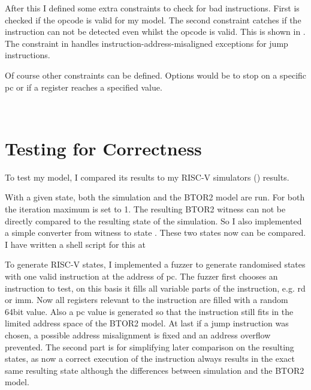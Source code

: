 After this I defined some extra constraints to check for bad instructions.
First is checked if the opcode is valid for my model. The second constraint
catches if the instruction can not be detected even whilst the opcode is valid.
This is shown in . The constraint in
 handles instruction-address-misaligned exceptions for
jump instructions.

Of course other constraints can be defined. Options would be to stop on a
specific pc or if a register reaches a specified value.

\\





\section{Testing for Correctness}\label{sec:corectness}
To test my model, I compared its results to my RISC-V simulators
() results.

With a given state, both the simulation and the BTOR2 model are run. For both
the iteration maximum is set to 1. The resulting BTOR2 witness can not be
directly compared to the resulting state of the simulation. So I also
implemented a simple converter from witness to state
\cite[src/restate\_witness.c]{repoRV2BTOR}. These two states now can be
compared. I have written a shell script for this at
\cite[sh\_utils/compare\_iterations.sh]{repoRV2BTOR}

To generate RISC-V states, I implemented a fuzzer
\cite[src/state\_fuzzer.c]{repoRV2BTOR} to generate randomised states with one
valid instruction at the address of pc. The fuzzer first chooses an instruction
to test, on this basis it fills all variable parts of the instruction, e.g. rd
or imm. Now all registers relevant to the instruction are filled with a random
64bit value. Also a pc value is generated so that the instruction still fits in
the limited address space of the BTOR2 model. At last if a jump instruction was
chosen, a possible address misalignment is fixed and an address overflow
prevented. The second part is for simplifying later comparison on the resulting
states, as now a correct execution of the instruction always results in the
exact same resulting state although the differences between simulation and the
BTOR2 model.

